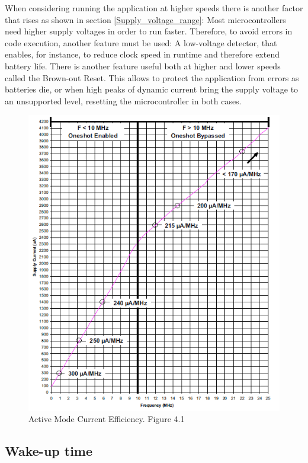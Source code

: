 \documentclass[11pt,a4paper]{report}
\begin{document}
When considering running the application at higher speeds there is another factor that rises as shown in section \ref{Supply_voltage_range}: Most microcontrollers need higher supply voltages in order to run faster. Therefore, to avoid errors in code execution, another feature must be used: A low-voltage detector, that enables, for instance, to reduce clock speed in runtime and therefore extend battery life.
There is another feature useful both at higher and lower speeds called the Brown-out Reset. This allows to protect the application from errors as batteries die, or when high peaks of dynamic current bring the supply voltage to an unsupported level, resetting the microcontroller in both cases.
  
\begin{figure}[ht!]
\centering
\includegraphics[width=0.9\linewidth]{./system_efficiency_silicon_labs}
\caption{Active Mode Current Efficiency. Figure 4.1 \cite{C8051F93x}}
\label{fig:system_efficiency_silicon_labs}
\end{figure}


\subsection{Wake-up time}
\end{document}
